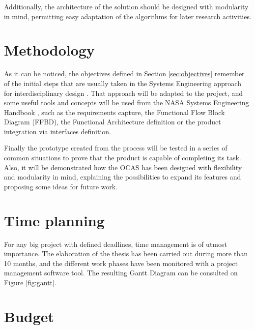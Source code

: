 Additionally, the architecture of the solution should be designed with modularity in mind, permitting easy adaptation of the algorithms for later research activities.

\section{Methodology} \label{sec:methodology}

As it can be noticed, the objectives defined in Section \ref{sec:objectives} remember of the initial steps that are usually taken in the Systems Engineering approach for interdisciplinary design \cite{whatissystemsengineering}.
That approach will be adapted to the project, and some useful tools and concepts will be used from the NASA Systems Engineering Handbook \cite{nationalaeronauticsandspaceadministration2007}, such as the requirements capture, the Functional Flow Block Diagram (FFBD), the Functional Architecture definition or the product integration via interfaces definition.

Finally the prototype created from the process will be tested in a series of common situations to prove that the product is capable of completing its task.
Also, it will be demonstrated how the OCAS has been designed with flexibility and modularity in mind, explaining the possibilities to expand its features and proposing some ideas for future work.

\section{Time planning}

For any big project with defined deadlines, time management is of utmost importance.
The elaboration of the thesis has been carried out during more than 10 months, and the different work phases have been monitored with a project management software tool.
The resulting Gantt Diagram can be consulted on Figure \ref{fig:gantt}.




\section{Budget}

